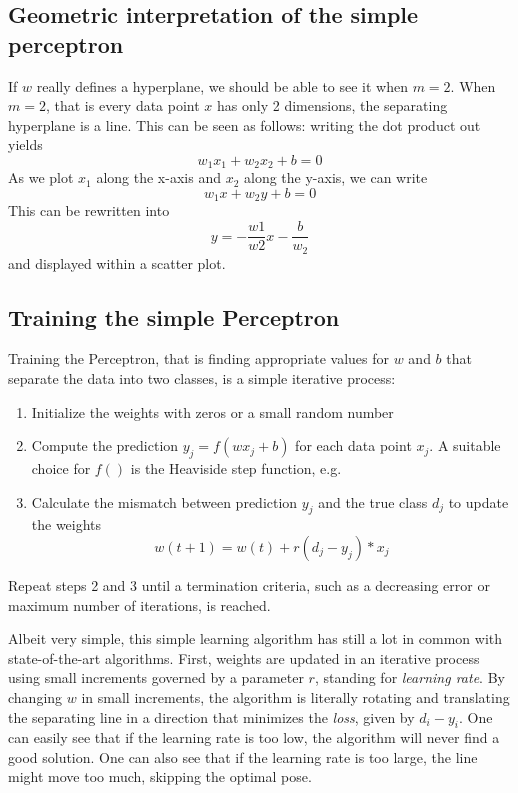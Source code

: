 \subsection{Geometric interpretation of the simple perceptron}
If $w$ really defines a hyperplane, we should be able to see it when $m=2$. When $m=2$, that is every data point $x$ has only 2 dimensions, the separating hyperplane is a line. This can be seen as follows: writing the dot product out yields
\begin{equation}
w_1x_1+w_2x_2+b=0
\end{equation}
As we plot $x_1$ along the x-axis and $x_2$ along the y-axis, we can write
\begin{equation}
w_1x+w_2y+b=0
\end{equation}
This can be rewritten into
\begin{equation}
y=-\frac{w1}{w2}x-\frac{b}{w_2}
\end{equation}
and displayed within a scatter plot.

\subsection{Training the simple Perceptron}
Training the Perceptron, that is finding appropriate values for $w$ and $b$ that separate the data into two classes, is a simple iterative process:

\begin{enumerate}
\item Initialize the weights with zeros or a small random number
\item Compute the prediction $y_j=f(wx_j+b)$ for each data point $x_j$. A suitable choice for $f()$ is the Heaviside step function, e.g.
\item Calculate the mismatch between prediction $y_j$ and the true class $d_j$ to update the weights
\begin{equation}
w(t+1)=w(t)+r(d_j-y_j)*x_j
\end{equation}
\end{enumerate}

Repeat steps 2 and 3 until a termination criteria, such as a decreasing error or maximum number of iterations, is reached.

Albeit very simple, this simple learning algorithm has still a lot in common with state-of-the-art algorithms. First, weights are updated in an iterative process using small increments governed by a parameter $r$, standing for \textsl{learning rate}. By changing $w$ in small increments, the algorithm is literally rotating and translating the separating line in a direction that minimizes the \textsl{loss}, given by $d_i-y_i$. One can easily see that if the learning rate is too low, the algorithm will never find a good solution. One can also see that if the learning rate is too large, the line might move too much, skipping the optimal pose.

